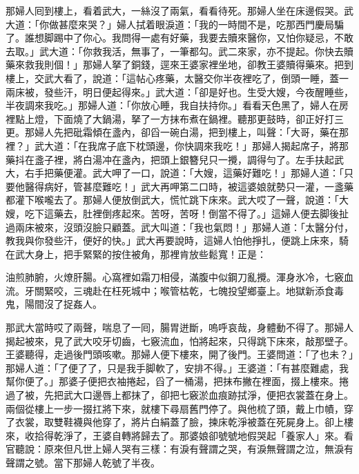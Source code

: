 那婦人囘到樓上，看着武大，一絲沒了兩氣，看看待死。那婦人坐在床邊假哭。武大道：「你做甚麼來哭？」婦人拭着眼淚道：「我的一時間不是，吃那西門慶局騙了。誰想脚踢中了你心。我問得一處有好藥，我要去贖來醫你，又怕你疑忌，不敢去取。」武大道：「你救我活，無事了，一筆都勾。武二來家，亦不提起。你快去贖藥來救我則個！」那婦人拏了銅錢，逕來王婆家裡坐地，卻教王婆贖得藥來。把到樓上，交武大看了，說道：「這帖心疼藥，太醫交你半夜裡吃了，倒頭一睡，蓋一兩床被，發些汗，明日便起得來。」武大道：「卻是好也。生受大嫂，今夜醒睡些，半夜調來我吃。」{}那婦人道：「你放心睡，我自扶持你。」{}看看天色黑了，婦人在房裡點上燈，下面燒了大鍋湯，拏了一方抹布煮在鍋裡。聽那更鼓時，卻正好打三更。那婦人先把砒霜傾在盞內，卻舀一碗白湯，把到樓上，叫聲：「大哥，藥在那裡？」武大道：「在我席子底下枕頭邊，你快調來我吃！」{}那婦人揭起席子，將那藥抖在盞子裡，將白湯冲在盞內，把頭上銀簪兒只一攪，調得勻了。左手扶起武大，右手把藥便灌。武大呷了一口，說道：「大嫂，這藥好難吃！」那婦人道：「只要他醫得病好，{}管甚麼難吃！」武大再呷第二口時，被這婆娘就勢只一灌，一盞藥都灌下喉嚨去了。那婦人便放倒武大，慌忙跳下床來。武大哎了一聲，說道：「大嫂，吃下這藥去，肚裡倒疼起來。苦呀，苦呀！倒當不得了。」這婦人便去脚後扯過兩床被來，沒頭沒臉只顧蓋。武大叫道：「我也氣悶！」那婦人道：「太醫分付，教我與你發些汗，便好的快。」武大再要說時，這婦人怕他掙扎，便跳上床來，騎在武大身上，把手緊緊的按住被角，那裡肯放些鬆寬！正是：

\begin{myquote} 
油煎肺腑，火燎肝腸。心窩裡如霜刀相侵，滿腹中似鋼刀亂攪。渾身氷冷，七竅血流。牙關緊咬，三魂赴在枉死城中；喉管枯乾，七魄投望鄉臺上。地獄新添食毒鬼，陽間沒了捉姦人。
\end{myquote} 

那武大當時哎了兩聲，喘息了一囘，腸胃迸斷，嗚呼哀哉，身體動不得了。那婦人揭起被來，見了武大咬牙切齒，七竅流血，怕將起來，只得跳下床來，敲那壁子。王婆聽得，走過後門頭咳嗽。那婦人便下樓來，開了後門。王婆問道：「了也未？」那婦人道：「了便了了，只是我手脚軟了，安排不得。」王婆道：「有甚麼難處，我幫你便了。」那婆子便把衣袖捲起，舀了一桶湯，把抹布撇在裡面，掇上樓來。捲過了被，先把武大口邊唇上都抹了，卻把七竅淤血痕跡拭淨，便把衣裳蓋在身上。兩個從樓上一步一掇扛將下來，就樓下尋扇舊門停了。與他梳了頭，戴上巾幘，穿了衣裳，取雙鞋襪與他穿了，將片白絹蓋了臉，揀床乾淨被蓋在死屍身上。卻上樓來，收拾得乾淨了，王婆自轉將歸去了。那婆娘卻號號地假哭起「養家人」來。看官聽說：原來但凡世上婦人哭有三樣：有淚有聲謂之哭，有淚無聲謂之泣，無淚有聲謂之號。當下那婦人乾號了半夜。

